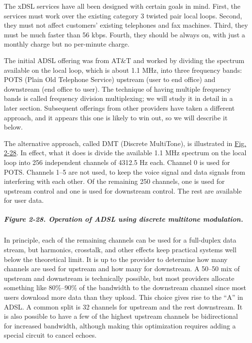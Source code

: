 The xDSL services have all been designed with certain goals in mind.
First, the services must work over the existing category 3 twisted pair
local loops. Second, they must not affect customers' existing telephones
and fax machines. Third, they must be much faster than 56 kbps. Fourth,
they should be always on, with just a monthly charge but no per-minute
charge.

The initial ADSL offering was from AT\&T and worked by dividing the
spectrum available on the local loop, which is about 1.1 MHz, into three
frequency bands: {POTS} ({Plain Old Telephone Service}) upstream (user
to end office) and downstream (end office to user). The technique of
having multiple frequency bands is called frequency division
multiplexing; we will study it in detail in a later section. Subsequent
offerings from other providers have taken a different approach, and it
appears this one is likely to win out, so we will describe it below.

The alternative approach, called {DMT} ({Discrete MultiTone}), is
illustrated in
\protect\hyperlink{0130661023_ch02lev1sec5.htmlux5cux23ch02fig28}{Fig.
2-28}. In effect, what it does is divide the available 1.1 MHz spectrum
on the local loop into 256 independent channels of 4312.5 Hz each.
Channel 0 is used for POTS. Channels 1--5 are not used, to keep the
voice signal and data signals from interfering with each other. Of the
remaining 250 channels, one is used for upstream control and one is used
for downstream control. The rest are available for user data.

\subparagraph[Figure 2-28. Operation of ADSL using discrete multitone
modulation.]{\texorpdfstring{\protect\hypertarget{0130661023_ch02lev1sec5.htmlux5cux23ch02fig28}{}{}Figure
2-28. Operation of ADSL using discrete multitone
modulation.}{Figure 2-28. Operation of ADSL using discrete multitone modulation.}}


In principle, each of the remaining channels can be used for a
full-duplex data stream, but harmonics, crosstalk, and other effects
keep practical systems well below the theoretical limit. It is up to the
provider to determine how many channels are used for upstream and how
many for downstream. A 50--50 mix of upstream and downstream is
technically possible, but most providers allocate something like
80\%--90\% of the bandwidth to the downstream channel since most users
download more data than they upload. This choice gives rise to the ``A''
in ADSL. A common split is 32 channels for upstream and the rest
downstream. It is also possible to have a few of the highest upstream
channels be bidirectional for increased bandwidth, although making this
optimization requires adding a special circuit to cancel echoes.

